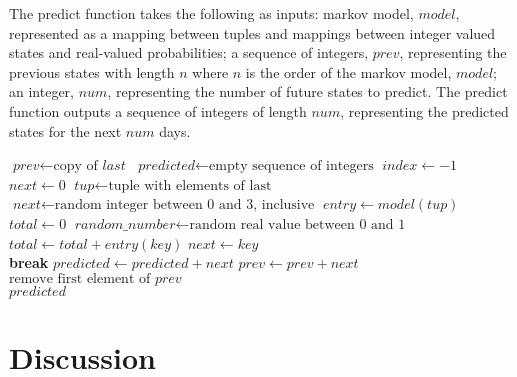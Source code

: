 \documentclass{article}
\begin{document}
    The predict function takes the following as inputs: markov model, $model$, represented as a mapping between tuples and mappings between integer valued states and real-valued probabilities; a sequence of integers, $prev$, representing the previous states with length $n$ where $n$ is the order of the markov model, $model$; an integer, $num$, representing the number of future states to predict. The predict function outputs a sequence of integers of length $num$, representing the predicted states for the next $num$ days.
    \begin{algorithm}
    \begin{algorithmic}[1]
        \State $\textit{prev} \gets \text{copy of } \textit{last}$
        \State $\textit{predicted} \gets \text{empty sequence of integers}$
        \State $\textit{index} \gets -1$
            \State $\textit{next} \gets 0$
            \State $\textit{tup} \gets \text{tuple with elements of last}$
                \State $\textit{next} \gets \text{random integer between 0 and 3, inclusive}$
            \Else
                \State $\textit{entry} \gets model(tup)$
                \State $\textit{total} \gets 0$
                \State $\textit{random\_number} \gets \text{random real value between 0 and 1}$
                    \State $\textit{total} \gets total + entry(key)$
                        \State $\textit{next} \gets key$\\
                        \hspace*{25mm} \textbf{break}
                    \EndIf
                \EndFor
            \EndIf
            \State $\textit{predicted} \gets predicted + next$
            \State $\textit{prev} \gets prev + next$
            \State $\text{remove first element of } prev$
        \EndWhile \\
        \hspace*{4mm} \Return $\textit{predicted}$
        \EndProcedure
    \end{algorithmic}
    \end{algorithm}
   
\section{Discussion}
\end{document}
